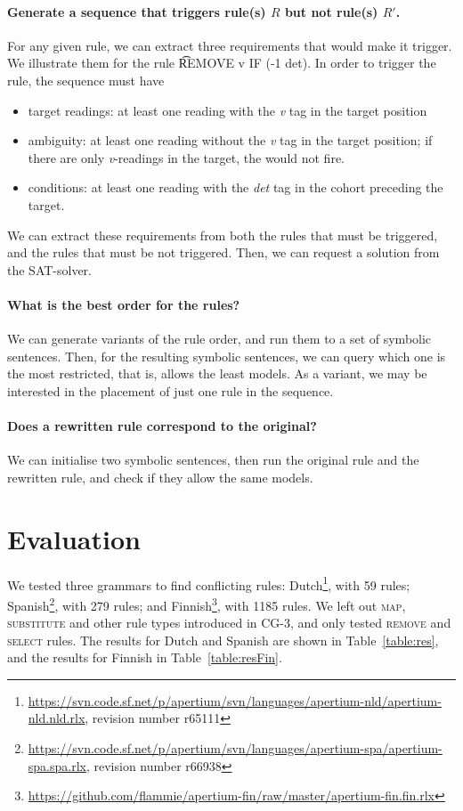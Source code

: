 {{\paragraph{Generate a sequence that triggers rule(s) $R$ but not rule(s) $R'$.}
For any given rule, we can extract three requirements that would make it trigger. We illustrate them for the rule \t{REMOVE v IF (-1 det)}. In order to trigger the rule, the sequence must have
\begin{itemize}
\item target readings: at least one reading with the \emph{v} tag in the target position
\item ambiguity: at least one reading without the \emph{v} tag in the target position; if there are only \emph{v}-readings in the target, the would not fire.
\item conditions: at least one reading with the \emph{det} tag in the cohort preceding the target.
\end{itemize}

We can extract these requirements from both the rules that must be triggered, and the rules that must be not triggered. Then, we can request a solution from the SAT-solver.

\paragraph{What is the best order for the rules?}
We can generate variants of the rule order, and run them to a set of symbolic sentences. Then, for the resulting symbolic sentences, we can query which one is the most restricted, that is, allows the least models.
As a variant, we may be interested in the placement of just one rule in the sequence.

\paragraph{Does a rewritten rule correspond to the original?}
We can initialise two symbolic sentences, then run the original rule and the rewritten rule, and check if they allow the same models. 



\section{Evaluation}
\label{sec:eval}

We tested three grammars to find conflicting rules: 
Dutch\footnote{\scriptsize{\url{https://svn.code.sf.net/p/apertium/svn/languages/apertium-nld/apertium-nld.nld.rlx}, revision number r65111}},
with 59 rules; 
Spanish\footnote{\scriptsize{\url{https://svn.code.sf.net/p/apertium/svn/languages/apertium-spa/apertium-spa.spa.rlx}}, revision number r66938},
with 279 rules; and 
Finnish\footnote{\scriptsize{\url{https://github.com/flammie/apertium-fin/raw/master/apertium-fin.fin.rlx}}},
with 1185 rules. We left out \textsc{map}, \textsc{substitute} and other rule
types introduced in CG-3, and only tested \textsc{remove} and \textsc{select} rules.
The results for Dutch and Spanish are shown in Table~\ref{table:res},
and the results for Finnish in Table~\ref{table:resFin}.


}}
